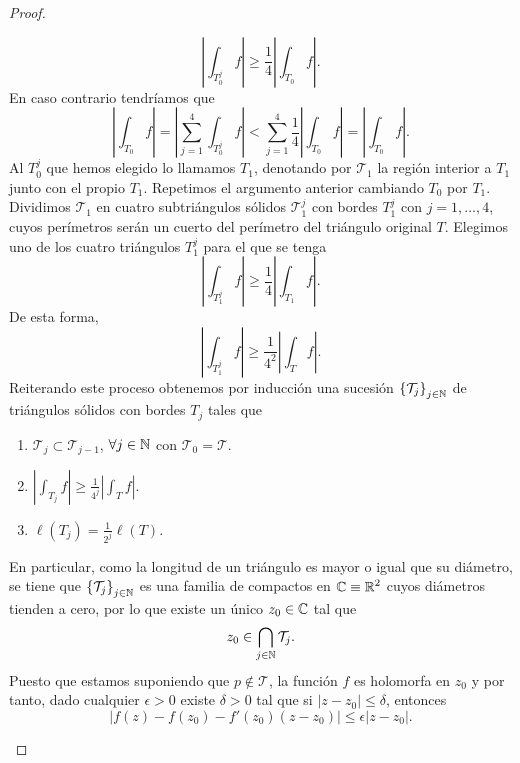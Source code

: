 \begin{proof}
\begin{description}
\[ \left|\int _{T_{0}^{j}}f \right|\geq \frac{1}{4} \left|\int _{T_{0}}f \right| .\]
En caso contrario tendríamos que 
\[ \left|\int _{T_{0}}f \right|= \left|\sum^{4}_{j=1}\int _{T_{0}^{j}}f \right|<\sum^{4}_{j=1}\frac{1}{4} \left|\int _{T_{0}}f \right|= \left|\int _{T_{0}}f \right| .\]
Al $\displaystyle T^{j}_{0} $ que hemos elegido lo llamamos $\displaystyle T_{1} $, denotando por $\displaystyle \mathcal{T}_{1} $ la región interior a $\displaystyle T_{1} $ junto con el propio $\displaystyle T_{1} $. Repetimos el argumento anterior cambiando $\displaystyle T_{0} $ por $\displaystyle T_{1} $. Dividimos $\displaystyle \mathcal{T}_{1} $ en cuatro subtriángulos sólidos $\displaystyle \mathcal{T}^{j}_{1} $ con bordes $\displaystyle T^{j}_{1} $ con $\displaystyle j = 1, \ldots, 4 $, cuyos perímetros serán un cuerto del perímetro del triángulo original $\displaystyle T $. 
Elegimos uno de los cuatro triángulos $\displaystyle T^{j}_{1} $ para el que se tenga 
\[ \left|\int _{T^{j}_{1}}f \right|\geq \frac{1}{4} \left|\int _{T_{1}}f \right| .\]
De esta forma, 
\[ \left|\int _{T^{j}_{1}}f \right|\geq \frac{1}{4^{2}} \left|\int _{T}f \right| .\]
Reiterando este proceso obtenemos por inducción una sucesión $\displaystyle \left\{ \mathcal{T}_{j}\right\} _{j \in \mathbb{N}} $ de triángulos sólidos con bordes $\displaystyle T_{j} $ tales que 
\begin{enumerate}
\item $\displaystyle \mathcal{T}_{j}\subset\mathcal{T}_{j-1} $, $\displaystyle \forall j \in \mathbb{N} $ con $\displaystyle \mathcal{T}_{0}=\mathcal{T} $. 
\item $\displaystyle \left|\int _{T_{j}}f \right|\geq \frac{1}{4^{j}} \left|\int _{T}f \right| $. 
\item $\displaystyle \ell\left(T_{j}\right)=\frac{1}{2^{j}}\ell\left(T\right) $.  
\end{enumerate}
En particular, como la longitud de un triángulo es mayor o igual que su diámetro, se tiene que $\displaystyle \left\{ \mathcal{T}_{j}\right\} _{j \in \mathbb{N}} $ es una familia de compactos en $\displaystyle \mathbb{C} \equiv \mathbb{R}^{2} $ cuyos diámetros tienden a cero, por lo que existe un único $\displaystyle z_{0} \in \mathbb{C} $ tal que 
\[z_{0}\in \bigcap_{j \in \mathbb{N}}\mathcal{T}_{j} .\]
Puesto que estamos suponiendo que $\displaystyle p \not\in \mathcal{T} $, la función $\displaystyle f $ es holomorfa en $\displaystyle z_{0} $ y por tanto, dado cualquier $\displaystyle \epsilon > 0 $ existe $\displaystyle \delta > 0 $ tal que si $\displaystyle \left|z-z_{0}\right|\leq \delta  $, entonces
\[ \left|f\left(z\right)-f\left(z_{0}\right)-f'\left(z_{0}\right)\left(z-z_{0}\right)\right|\leq \epsilon \left|z-z_{0}\right| .\]

\end{description}
\end{proof}
